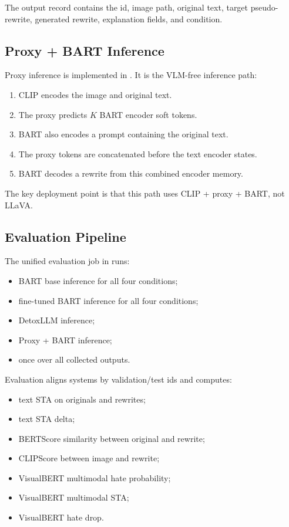 \documentclass[11pt,a4paper]{article}
\newcommand{\code}[1]{\texttt{\detokenize{#1}}}
\begin{document}
The output record contains the id, image path, original text, target pseudo-rewrite, generated rewrite, explanation fields, and condition.

\subsection{Proxy + BART Inference}

Proxy inference is implemented in . It is the VLM-free inference path:

\begin{enumerate}
  \item CLIP encodes the image and original text.
  \item The proxy predicts \(K\) BART encoder soft tokens.
  \item BART also encodes a \code{none} prompt containing the original text.
  \item The proxy tokens are concatenated before the text encoder states.
  \item BART decodes a rewrite from this combined encoder memory.
\end{enumerate}

The key deployment point is that this path uses CLIP + proxy + BART, not LLaVA.

\subsection{Evaluation Pipeline}

The unified evaluation job in  runs:

\begin{itemize}
  \item BART base inference for all four conditions;
  \item fine-tuned BART inference for all four conditions;
  \item DetoxLLM inference;
  \item Proxy + BART inference;
  \item {} once over all collected outputs.
\end{itemize}

Evaluation aligns systems by validation/test ids and computes:

\begin{itemize}
  \item text STA on originals and rewrites;
  \item text STA delta;
  \item BERTScore similarity between original and rewrite;
  \item CLIPScore between image and rewrite;
  \item VisualBERT multimodal hate probability;
  \item VisualBERT multimodal STA;
  \item VisualBERT hate drop.
\end{itemize}
\end{document}
